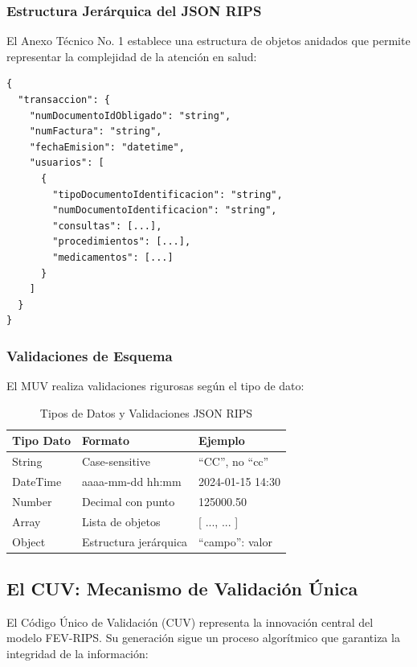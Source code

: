 \documentclass[12pt,letterpaper]{report}
\begin{document}
\subsubsection{Estructura Jerárquica del JSON RIPS}

El Anexo Técnico No. 1 establece una estructura de objetos anidados que permite representar la complejidad de la atención en salud:

\begin{verbatim}
{
  "transaccion": {
    "numDocumentoIdObligado": "string",
    "numFactura": "string",
    "fechaEmision": "datetime",
    "usuarios": [
      {
        "tipoDocumentoIdentificacion": "string",
        "numDocumentoIdentificacion": "string",
        "consultas": [...],
        "procedimientos": [...],
        "medicamentos": [...]
      }
    ]
  }
}
\end{verbatim}

\subsubsection{Validaciones de Esquema}

El MUV realiza validaciones rigurosas según el tipo de dato:

\begin{table}[H]
\centering
\caption{Tipos de Datos y Validaciones JSON RIPS}
\begin{tabular}{@{}lll@{}}
\toprule
\textbf{Tipo Dato} & \textbf{Formato} & \textbf{Ejemplo} \\
\midrule
String & Case-sensitive & ``CC'', no ``cc'' \\
DateTime & aaaa-mm-dd hh:mm & 2024-01-15 14:30 \\
Number & Decimal con punto & 125000.50 \\
Array & Lista de objetos & [ {...}, {...} ] \\
Object & Estructura jerárquica & { ``campo'': valor } \\
\bottomrule
\end{tabular}
\end{table}

\subsection{El CUV: Mecanismo de Validación Única}

El Código Único de Validación (CUV) representa la innovación central del modelo FEV-RIPS. Su generación sigue un proceso algorítmico que garantiza la integridad de la información:
\end{document}
